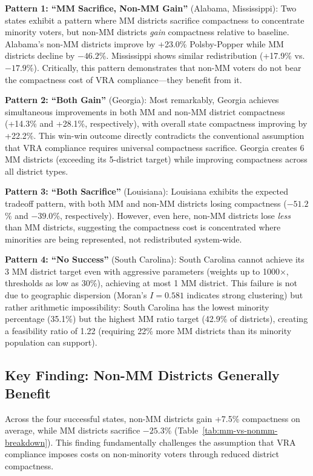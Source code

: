\textbf{Pattern 1: ``MM Sacrifice, Non-MM Gain''} (Alabama, Mississippi): Two states exhibit a pattern where MM districts sacrifice compactness to concentrate minority voters, but non-MM districts \emph{gain} compactness relative to baseline. Alabama's non-MM districts improve by +23.0\% Polsby-Popper while MM districts decline by $-46.2$\%. Mississippi shows similar redistribution (+17.9\% vs. $-17.9$\%). Critically, this pattern demonstrates that non-MM voters do not bear the compactness cost of VRA compliance---they benefit from it.

\textbf{Pattern 2: ``Both Gain''} (Georgia): Most remarkably, Georgia achieves simultaneous improvements in both MM and non-MM district compactness (+14.3\% and +28.1\%, respectively), with overall state compactness improving by +22.2\%. This win-win outcome directly contradicts the conventional assumption that VRA compliance requires universal compactness sacrifice. Georgia creates 6 MM districts (exceeding its 5-district target) while improving compactness across all district types.

\textbf{Pattern 3: ``Both Sacrifice''} (Louisiana): Louisiana exhibits the expected tradeoff pattern, with both MM and non-MM districts losing compactness ($-51.2$\% and $-39.0$\%, respectively). However, even here, non-MM districts lose \emph{less} than MM districts, suggesting the compactness cost is concentrated where minorities are being represented, not redistributed system-wide.

\textbf{Pattern 4: ``No Success''} (South Carolina): South Carolina cannot achieve its 3 MM district target even with aggressive parameters (weights up to 1000×, thresholds as low as 30\%), achieving at most 1 MM district. This failure is not due to geographic dispersion (Moran's $I = 0.581$ indicates strong clustering) but rather arithmetic impossibility: South Carolina has the lowest minority percentage (35.1\%) but the highest MM ratio target (42.9\% of districts), creating a feasibility ratio of 1.22 (requiring 22\% more MM districts than its minority population can support).

\subsection{Key Finding: Non-MM Districts Generally Benefit}

Across the four successful states, non-MM districts gain +7.5\% compactness on average, while MM districts sacrifice $-25.3$\% (Table~\ref{tab:mm-vs-nonmm-breakdown}). This finding fundamentally challenges the assumption that VRA compliance imposes costs on non-minority voters through reduced district compactness.

